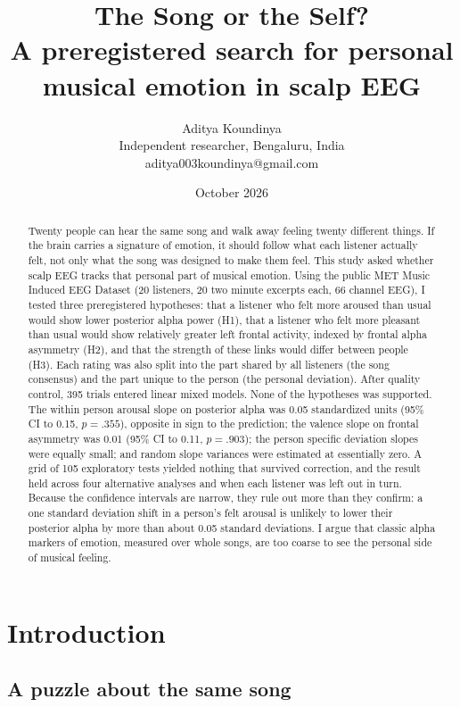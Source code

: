 \documentclass[11pt,a4paper]{article}
\title{\textbf{The Song or the Self?}\\[0.3em]
\large A preregistered search for personal musical emotion in scalp EEG}
\author{Aditya Koundinya\\
\small Independent researcher, Bengaluru, India\\
\small aditya003koundinya@gmail.com}
\date{October 2026}
\newcommand{\m}{\textminus}
\begin{document}
\maketitle

\begin{abstract}
\noindent Twenty people can hear the same song and walk away feeling twenty different things. If the brain carries a signature of emotion, it should follow what each listener actually felt, not only what the song was designed to make them feel. This study asked whether scalp EEG tracks that personal part of musical emotion. Using the public MET Music Induced EEG Dataset (20 listeners, 20 two minute excerpts each, 66 channel EEG), I tested three preregistered hypotheses: that a listener who felt more aroused than usual would show lower posterior alpha power (H1), that a listener who felt more pleasant than usual would show relatively greater left frontal activity, indexed by frontal alpha asymmetry (H2), and that the strength of these links would differ between people (H3). Each rating was also split into the part shared by all listeners (the song consensus) and the part unique to the person (the personal deviation). After quality control, 395 trials entered linear mixed models. None of the hypotheses was supported. The within person arousal slope on posterior alpha was 0.05 standardized units (95\% CI \m0.05 to 0.15, $p = .355$), opposite in sign to the prediction; the valence slope on frontal asymmetry was 0.01 (95\% CI \m0.10 to 0.11, $p = .903$); the person specific deviation slopes were equally small; and random slope variances were estimated at essentially zero. A grid of 105 exploratory tests yielded nothing that survived correction, and the result held across four alternative analyses and when each listener was left out in turn. Because the confidence intervals are narrow, they rule out more than they confirm: a one standard deviation shift in a person's felt arousal is unlikely to lower their posterior alpha by more than about 0.05 standard deviations. I argue that classic alpha markers of emotion, measured over whole songs, are too coarse to see the personal side of musical feeling.
\end{abstract}

\section{Introduction}

\subsection{A puzzle about the same song}
\end{document}
